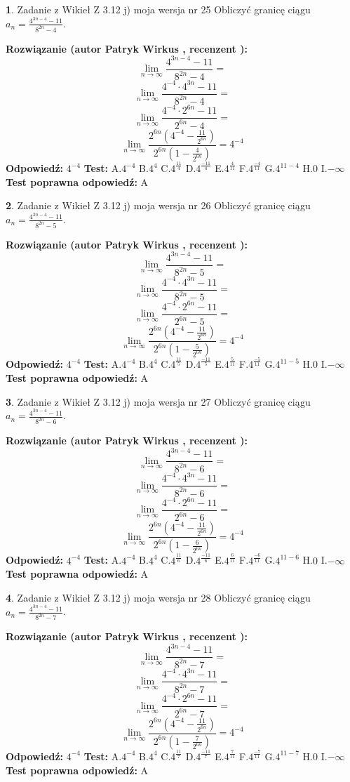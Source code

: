 \documentclass[12pt, a4paper]{article}
\theoremstyle{definition} %
\newtheorem{zad}{}
\newcommand{\zadStart}[1]{\begin{zad}#1\newline}
\newcommand{\zadStop}{\end{zad}}
\newcommand{\rozwStart}[2]{\noindent \textbf{Rozwiązanie (autor #1 , recenzent #2): }\newline}
\newcommand{\rozwStop}{\newline}
\newcommand{\odpStart}{\noindent \textbf{Odpowiedź:}\newline}
\newcommand{\odpStop}{\newline}
\newcommand{\testStart}{\noindent \textbf{Test:}\newline}
\newcommand{\testStop}{\newline}
\newcommand{\kluczStart}{\noindent \textbf{Test poprawna odpowiedź:}\newline}
\newcommand{\kluczStop}{\newline}
\begin{document}
\zadStart{Zadanie z Wikieł Z 3.12 j) moja wersja nr 25}
Obliczyć granicę ciągu $a_{n}=\frac{4^{3n-4}-11}{8^{2n}-4}$.
\zadStop
\rozwStart{Patryk Wirkus}{}
$$\lim\limits_{n\to\infty}\frac{4^{3n-4}-11}{8^{2n}-4}=$$
$$\lim\limits_{n\to\infty}\frac{4^{-4} \cdot 4^{3n}-11}{8^{2n}-4}=$$
$$\lim\limits_{n\to\infty}\frac{4^{-4} \cdot 2^{6n}-11}{2^{6n}-4}=$$
$$\lim\limits_{n\to\infty}\frac{2^{6n}(4^{-4} - \frac{11}{2^{6n}})}{2^{6n}(1-\frac{4}{2^{6n}})}= 4^{-4}$$
\rozwStop
\odpStart
$4^{-4}$
\odpStop
\testStart
A.$4^{-4}$
B.$4^{4}$
C.$4^{\frac{11}{4}}$
D.$4^{\frac{-11}{4}}$
E.$4^{\frac{4}{11}}$
F.$4^{\frac{-4}{11}}$
G.$4^{11-4}$
H.$0$
I.$-\infty$
\testStop
\kluczStart
A
\kluczStop



\zadStart{Zadanie z Wikieł Z 3.12 j) moja wersja nr 26}
Obliczyć granicę ciągu $a_{n}=\frac{4^{3n-4}-11}{8^{2n}-5}$.
\zadStop
\rozwStart{Patryk Wirkus}{}
$$\lim\limits_{n\to\infty}\frac{4^{3n-4}-11}{8^{2n}-5}=$$
$$\lim\limits_{n\to\infty}\frac{4^{-4} \cdot 4^{3n}-11}{8^{2n}-5}=$$
$$\lim\limits_{n\to\infty}\frac{4^{-4} \cdot 2^{6n}-11}{2^{6n}-5}=$$
$$\lim\limits_{n\to\infty}\frac{2^{6n}(4^{-4} - \frac{11}{2^{6n}})}{2^{6n}(1-\frac{5}{2^{6n}})}= 4^{-4}$$
\rozwStop
\odpStart
$4^{-4}$
\odpStop
\testStart
A.$4^{-4}$
B.$4^{4}$
C.$4^{\frac{11}{5}}$
D.$4^{\frac{-11}{5}}$
E.$4^{\frac{5}{11}}$
F.$4^{\frac{-5}{11}}$
G.$4^{11-5}$
H.$0$
I.$-\infty$
\testStop
\kluczStart
A
\kluczStop



\zadStart{Zadanie z Wikieł Z 3.12 j) moja wersja nr 27}
Obliczyć granicę ciągu $a_{n}=\frac{4^{3n-4}-11}{8^{2n}-6}$.
\zadStop
\rozwStart{Patryk Wirkus}{}
$$\lim\limits_{n\to\infty}\frac{4^{3n-4}-11}{8^{2n}-6}=$$
$$\lim\limits_{n\to\infty}\frac{4^{-4} \cdot 4^{3n}-11}{8^{2n}-6}=$$
$$\lim\limits_{n\to\infty}\frac{4^{-4} \cdot 2^{6n}-11}{2^{6n}-6}=$$
$$\lim\limits_{n\to\infty}\frac{2^{6n}(4^{-4} - \frac{11}{2^{6n}})}{2^{6n}(1-\frac{6}{2^{6n}})}= 4^{-4}$$
\rozwStop
\odpStart
$4^{-4}$
\odpStop
\testStart
A.$4^{-4}$
B.$4^{4}$
C.$4^{\frac{11}{6}}$
D.$4^{\frac{-11}{6}}$
E.$4^{\frac{6}{11}}$
F.$4^{\frac{-6}{11}}$
G.$4^{11-6}$
H.$0$
I.$-\infty$
\testStop
\kluczStart
A
\kluczStop



\zadStart{Zadanie z Wikieł Z 3.12 j) moja wersja nr 28}
Obliczyć granicę ciągu $a_{n}=\frac{4^{3n-4}-11}{8^{2n}-7}$.
\zadStop
\rozwStart{Patryk Wirkus}{}
$$\lim\limits_{n\to\infty}\frac{4^{3n-4}-11}{8^{2n}-7}=$$
$$\lim\limits_{n\to\infty}\frac{4^{-4} \cdot 4^{3n}-11}{8^{2n}-7}=$$
$$\lim\limits_{n\to\infty}\frac{4^{-4} \cdot 2^{6n}-11}{2^{6n}-7}=$$
$$\lim\limits_{n\to\infty}\frac{2^{6n}(4^{-4} - \frac{11}{2^{6n}})}{2^{6n}(1-\frac{7}{2^{6n}})}= 4^{-4}$$
\rozwStop
\odpStart
$4^{-4}$
\odpStop
\testStart
A.$4^{-4}$
B.$4^{4}$
C.$4^{\frac{11}{7}}$
D.$4^{\frac{-11}{7}}$
E.$4^{\frac{7}{11}}$
F.$4^{\frac{-7}{11}}$
G.$4^{11-7}$
H.$0$
I.$-\infty$
\testStop
\kluczStart
A
\kluczStop
\end{document}
